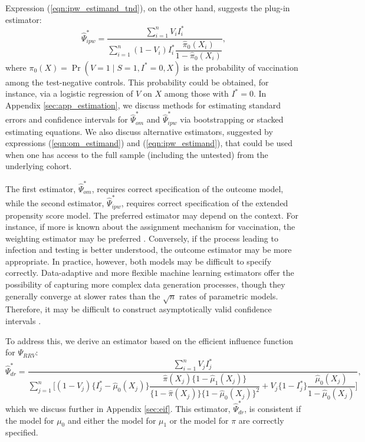 \documentclass[11pt]{article}
\begin{document}
Expression (\ref{eqn:ipw_estimand_tnd}), on the other hand, suggests the plug-in estimator:
\begin{equation}\label{eqn:ipw_estimator}
    \widehat{\Psi}_{ipw}^* = \dfrac{\sum_{i=1}^n V_i I^*_i}{\sum_{i=1}^n (1 - V_i) I^*_i \dfrac{\widehat\pi_0(X_i)}{1 - \widehat\pi_0(X_i)}},
\end{equation}
where $\pi_0(X) = \Pr(V=1\mid S=1, I^*=0, X)$ is the probability of vaccination among the test-negative controls. This probability could be obtained, for instance, via a logistic regression of $V$ on $X$ among those with $I^*=0$. In Appendix \ref{sec:app_estimation}, we discuss methods for estimating standard errors and confidence intervals for $\widehat{\Psi}_{om}^*$ and $\widehat{\Psi}_{ipw}^*$ via bootstrapping or stacked estimating equations. We also discuss alternative estimators, suggested by expressions (\ref{eqn:om_estimand}) and (\ref{eqn:ipw_estimand}), that could be used when one has access to the full sample (including the untested) from the underlying cohort.

The first estimator, $\widehat{\Psi}_{om}^*$, requires  correct specification of the outcome model, while the second estimator, $\widehat{\Psi}_{ipw}^*$, requires correct specification of the extended propensity score model. The preferred estimator may depend on the context. For instance, if more is known about the assignment mechanism for vaccination, the weighting estimator may be preferred \cite{robins_estimating_1992,braitman_rare_2002}. Conversely, if the process leading to infection and testing is better understood, the outcome estimator may be more appropriate. In practice, however, both models may be difficult to specify correctly. Data-adaptive and more flexible machine learning estimators offer the possibility of capturing more complex data generation processes, though they generally converge at slower rates than the $\sqrt{n}$ rates of parametric models. Therefore, it may be difficult to construct asymptotically valid confidence intervals \cite{chernozhukov_doubledebiased_2018}. 

To address this, we derive an estimator based on the efficient influence function for $\Psi_{RRV}$:
\begin{equation}\label{eqn:dr_estimator}
    \widehat{\Psi}_{dr}^* = \dfrac{\sum_{i=1}^n V_jI_j^*}{\sum_{j=1}^n\bigg[ (1-V_j)\{I^*_j - \widehat\mu_0(X_j)\}\dfrac{\widehat\pi(X_j)\{1 - \widehat\mu_1(X_j)\}}{\{1 - \widehat\pi(X_j)\}\{1 - \widehat\mu_0(X_j)\}^2} + V_j\{1-I^*_j\}\dfrac{\widehat\mu_0(X_j)}{1-\widehat \mu_0(X_j)}\bigg]},
\end{equation}
which we discuss further in Appendix \ref{sec:eif}.
This estimator, $\widehat\Psi_{dr}^*$, is consistent if the model for $\mu_0$ and either the model for $\mu_1$ or the model for $\pi$ are correctly specified.
\end{document}
